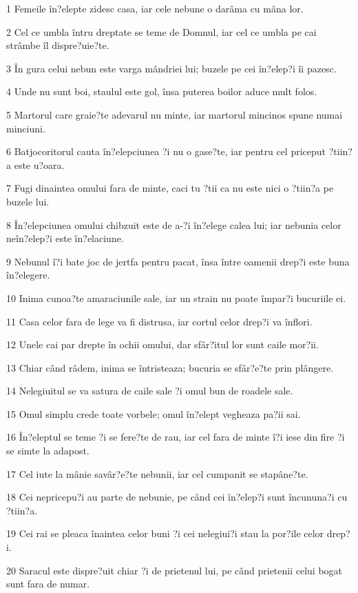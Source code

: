 \par 1 Femeile în?elepte zidesc casa, iar cele nebune o darâma cu mâna lor.
\par 2 Cel ce umbla întru dreptate se teme de Domnul, iar cel ce umbla pe cai strâmbe îl dispre?uie?te.
\par 3 În gura celui nebun este varga mândriei lui; buzele pe cei în?elep?i îi pazesc.
\par 4 Unde nu sunt boi, staulul este gol, însa puterea boilor aduce mult folos.
\par 5 Martorul care graie?te adevarul nu minte, iar martorul mincinos spune numai minciuni.
\par 6 Batjocoritorul cauta în?elepciunea ?i nu o gase?te, iar pentru cel priceput ?tiin?a este u?oara.
\par 7 Fugi dinaintea omului fara de minte, caci tu ?tii ca nu este nici o ?tiin?a pe buzele lui.
\par 8 În?elepciunea omului chibzuit este de a-?i în?elege calea lui; iar nebunia celor neîn?elep?i este în?elaciune.
\par 9 Nebunul î?i bate joc de jertfa pentru pacat, însa între oamenii drep?i este buna în?elegere.
\par 10 Inima cunoa?te amaraciunile sale, iar un strain nu poate împar?i bucuriile ei.
\par 11 Casa celor fara de lege va fi distrusa, iar cortul celor drep?i va înflori.
\par 12 Unele cai par drepte în ochii omului, dar sfâr?itul lor sunt caile mor?ii.
\par 13 Chiar când râdem, inima se întristeaza; bucuria se sfâr?e?te prin plângere.
\par 14 Nelegiuitul se va satura de caile sale ?i omul bun de roadele sale.
\par 15 Omul simplu crede toate vorbele; omul în?elept vegheaza pa?ii sai.
\par 16 În?eleptul se teme ?i se fere?te de rau, iar cel fara de minte î?i iese din fire ?i se simte la adapost.
\par 17 Cel iute la mânie savâr?e?te nebunii, iar cel cumpanit se stapâne?te.
\par 18 Cei nepricepu?i au parte de nebunie, pe când cei în?elep?i sunt încununa?i cu ?tiin?a.
\par 19 Cei rai se pleaca înaintea celor buni ?i cei nelegiui?i stau la por?ile celor drep?i.
\par 20 Saracul este dispre?uit chiar ?i de prietenul lui, pe când prietenii celui bogat sunt fara de numar.
